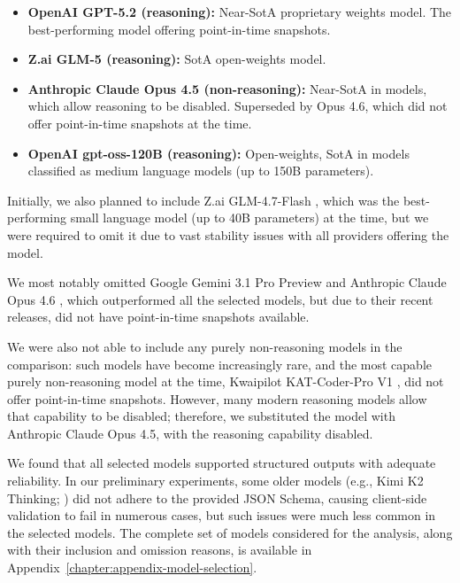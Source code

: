 \begin{itemize}
    \item \textbf{OpenAI GPT-5.2 (reasoning):}  Near-SotA proprietary weights model. The best-performing model offering point-in-time snapshots.
    \item \textbf{Z.ai GLM-5 (reasoning):}  SotA open-weights model.
    \item \textbf{Anthropic Claude Opus 4.5 (non-reasoning):}  Near-SotA in models, which allow reasoning to be disabled. Superseded by Opus 4.6, which did not offer point-in-time snapshots at the time.
    \item \textbf{OpenAI gpt-oss-120B (reasoning):}  Open-weights, SotA in models classified as medium language models (up to \num{150}B parameters).
\end{itemize}

Initially, we also planned to include Z.ai GLM-4.7-Flash , which was the best-performing small language model (up to \num{40}B parameters) at the time, but we were required to omit it due to vast stability issues with all providers offering the model.

We most notably omitted Google Gemini 3.1 Pro Preview  and Anthropic Claude Opus 4.6 , which outperformed all the selected models, but due to their recent releases, did not have point-in-time snapshots available.

We were also not able to include any purely non-reasoning models in the comparison: such models have become increasingly rare, and the most capable purely non-reasoning model at the time, Kwaipilot KAT-Coder-Pro V1 , did not offer point-in-time snapshots. However, many modern reasoning models allow that capability to be disabled; therefore, we substituted the model with Anthropic Claude Opus 4.5, with the reasoning capability disabled.

We found that all selected models supported structured outputs with adequate reliability. In our preliminary experiments, some older models (e.g., Kimi K2 Thinking; \citealp{DBLP:journals/corr/abs-2507-20534}) did not adhere to the provided JSON Schema, causing client-side validation to fail in numerous cases, but such issues were much less common in the selected models. The complete set of models considered for the analysis, along with their inclusion and omission reasons, is available in Appendix~\ref{chapter:appendix-model-selection}.

